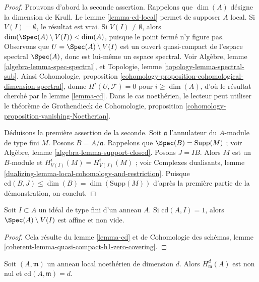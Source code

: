 \begin{proof}
Prouvons d'abord la seconde assertion. Rappelons que $\dim(A)$ désigne la dimension de Krull. Le lemme \ref{lemma-cd-local} permet de supposer $A$ local. Si $V(I) = \emptyset$, le résultat est vrai. Si $V(I) \not = \emptyset$, alors $\dim(\Spec(A) \setminus V(I)) < \dim(A)$, puisque le point fermé n'y figure pas. Observons que $U = \Spec(A) \setminus V(I)$ est un ouvert quasi-compact de l'espace spectral $\Spec(A)$, donc est lui-même un espace spectral. Voir Algèbre, lemme \ref{algebra-lemma-spec-spectral}, et Topologie, lemme \ref{topology-lemma-spectral-sub}. Ainsi Cohomologie, proposition \ref{cohomology-proposition-cohomological-dimension-spectral}, donne $H^i(U, \mathcal{F}) = 0$ pour $i \geq \dim(A)$, d'où le résultat cherché par le lemme \ref{lemma-cd}. Dans le cas noethérien, le lecteur peut utiliser le théorème de Grothendieck de Cohomologie, proposition \ref{cohomology-proposition-vanishing-Noetherian}.

\medskip\noindent
Déduisons la première assertion de la seconde. Soit $\mathfrak a$ l'annulateur du $A$-module de type fini $M$. Posons $B = A/\mathfrak a$. Rappelons que $\Spec(B) = \text{Supp}(M)$ ; voir Algèbre, lemme \ref{algebra-lemma-support-closed}. Posons $J = IB$. Alors $M$ est un $B$-module et $H^i_{V(I)}(M) = H^i_{V(J)}(M)$ ; voir Complexes dualisants, lemme \ref{dualizing-lemma-local-cohomology-and-restriction}. Puisque $\text{cd}(B, J) \leq \dim(B) = \dim(\text{Supp}(M))$ d'après la première partie de la démonstration, on conclut.
\end{proof}

\begin{lemma}
\label{lemma-cd-is-one}
Soit $I \subset A$ un idéal de type fini d'un anneau $A$. Si $\text{cd}(A, I) = 1$, alors $\Spec(A) \setminus V(I)$ est affine et non vide.
\end{lemma}

\begin{proof}
Cela résulte du lemme \ref{lemma-cd} et de Cohomologie des schémas, lemme \ref{coherent-lemma-quasi-compact-h1-zero-covering}.
\end{proof}

\begin{lemma}
\label{lemma-cd-maximal}
Soit $(A, \mathfrak m)$ un anneau local noethérien de dimension $d$. Alors $H^d_\mathfrak m(A)$ est non nul et $\text{cd}(A, \mathfrak m) = d$.
\end{lemma}


